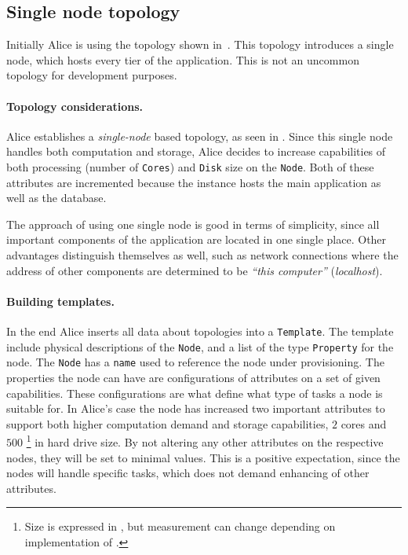 \subsection{Single node topology}

Initially Alice is using the topology shown in~.
This topology introduces a single node, which hosts every tier of the application.
This is not an uncommon topology for development purposes.

\paragraph{Topology considerations.}

Alice establishes a \emph{single-node} based topology, as seen in .
Since this single node handles both computation and storage, 
Alice decides to increase capabilities of both processing (number of \texttt{Cores}) and 
\texttt{Disk} size on the \texttt{Node}.
Both of these attributes are incremented because the instance hosts
the main application as well as the database.

The approach of using one single node is good in terms of simplicity,
since all important components of the application are located in one single place.
Other advantages distinguish themselves as well, such as network connections where
the address of other components are determined to be \emph{``this computer''} (\emph{localhost}).

\paragraph{Building templates.}

In the end Alice inserts all data about topologies into a \texttt{Template}. 
The template include physical descriptions of the \texttt{Node},
and a list of the type \texttt{Property} for the node.
The \texttt{Node} has a \texttt{name} used to reference the node under provisioning.
The properties the node can have are configurations of attributes on a set of given capabilities.
These configurations are what define what type of tasks a node is suitable for.
In Alice's case the node has increased two important attributes to support both higher computation 
demand and storage capabilities, \ie $2$ cores and $500$ \footnote{
  Size is expressed in , but measurement can change depending on implementation of .
}
in hard drive size.
By not altering any other attributes on the respective nodes, they will be set to minimal values.
This is a positive expectation, since the nodes will handle specific tasks, which does not 
demand enhancing of other attributes.

